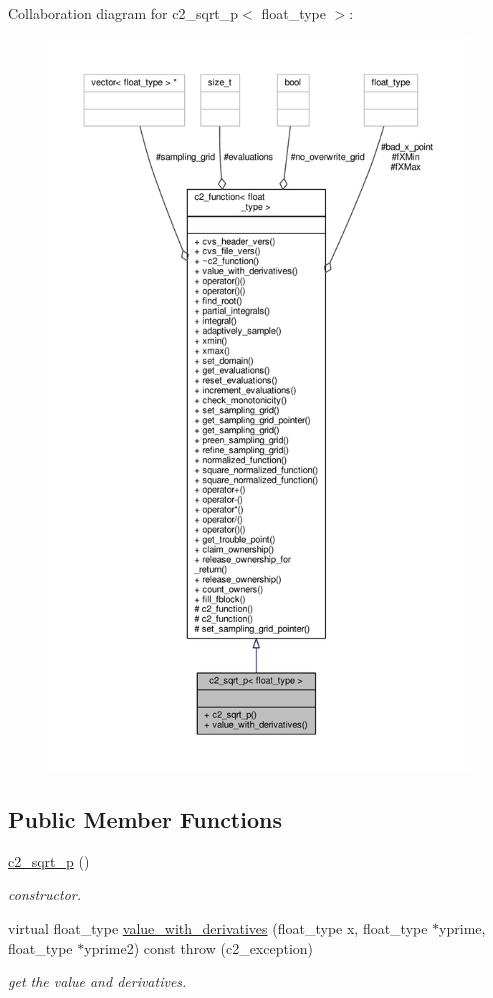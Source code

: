 Collaboration diagram for c2\+\_\+sqrt\+\_\+p$<$ float\+\_\+type $>$\+:
\nopagebreak
\begin{figure}[H]
\begin{center}
\leavevmode
\includegraphics[height=550pt]{classc2__sqrt__p__coll__graph}
\end{center}
\end{figure}
\subsection*{Public Member Functions}
\begin{DoxyCompactItemize}
\item 
\hyperlink{classc2__sqrt__p_a780a0f48a8fb428b2cb9fac74b7b56e7}{c2\+\_\+sqrt\+\_\+p} ()
\begin{DoxyCompactList}\small\item\em constructor. \end{DoxyCompactList}\item 
virtual float\+\_\+type \hyperlink{classc2__sqrt__p_aef50454e3f093a7e956c3a994b46ce9d}{value\+\_\+with\+\_\+derivatives} (float\+\_\+type x, float\+\_\+type $\ast$yprime, float\+\_\+type $\ast$yprime2) const   throw (c2\+\_\+exception)
\begin{DoxyCompactList}\small\item\em get the value and derivatives. \end{DoxyCompactList}\end{DoxyCompactItemize}
